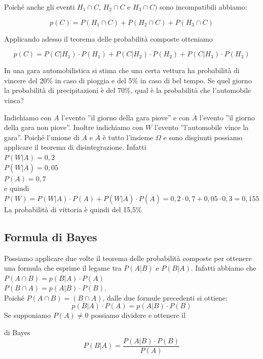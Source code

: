 Poiché anche gli eventi $H_1 \cap C$, $H_2 \cap C$ e $H_3 \cap C)$ sono 
incompatibili abbiamo:

$$p(C)=P(H_1 \cap C)+P(H_2 \cap C) + P(H_3 \cap C)$$

Applicando adesso il teorema delle probabilità composte otteniamo

$$p(C)=P(C|H_1)\cdot P(H_1)+P(C|H_2)\cdot P(H_2)+P(C|H_3)\cdot P(H_3)$$
\begin{esempio}
In una gara automobilistica si stima che una certa vettura ha probabilità di 
vincere del 20\% in caso di pioggia e del 5\% in caso di bel tempo. Se quel 
giorno la probabilità di precipitazioni è del 70\%, qual è la probabilità che 
l'automobile vinca?

Indichiamo con $A$ l'evento ''il giorno della gara piove'' e con $\overline 
A$ 
l'evento ''il giorno della gara non piove''. Inoltre indichiamo con $W$ 
l'evento ''l'automobile vince la gara''. Poiché l'unione di $A$ e $\overline 
A$ 
è tutto l'insieme $\Omega$ e sono disgiunti possiamo applicare il teorema di 
disintegrazione. Infatti\\
$P(W|A)=0,2$\\
$P(W|\overline A)=0,05$\\
$P(A)=0,7$\\
e quindi\\
$P(W)=P(W|A)\cdot P(A) + P(W|\overline A)\cdot P(\overline A)=0,2 \cdot 0,7 + 
0,05 \cdot 0,3 = 0,155$\\
La probabilità di vittoria è quindi del 15,5\%
\end{esempio}

\subsection{Formula di Bayes}
Possiamo applicare due volte il teorema delle probabilità composte per 
ottenere 
una formula che esprime il legame tra $P(A|B)$ e $P(B|A)$.
Infatti abbiamo che \\
$P(A\cap B)=p(B|A)\cdot P(A)$ \\
$P(B\cap A)=p(A|B)\cdot P(B)$.\\
Poiché $P(A\cap B) = (B\cap A)$, dalle due formule precedenti si ottiene:
$$p(B|A)\cdot P(A) = p(A|B)\cdot P(B)$$
Se supponiamo $P(A) \neq 0$ possiamo dividere e ottenere il
\begin{teorema}{di Bayes}
$$P(B|A)=\dfrac{P(A|B)\cdot P(B)}{P(A)}$$ 
\end{teorema} 


